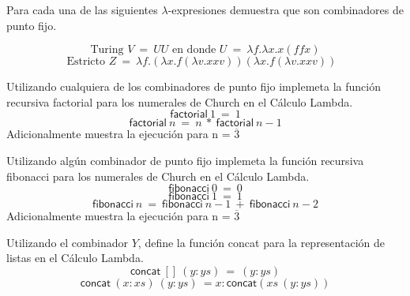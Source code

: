                 \begin{exercise}
                    Para cada una de las siguientes $\lambda$-expresiones demuestra que son combinadores de punto fijo.
                    

                        \[\text{Turing $V\ =\ UU$ en donde $U\ =\ \lambda f.\lambda x.x(ffx)$}\]
                        \[\text{Estricto $Z\ =\ \lambda f.(\lambda x.f(\lambda v.xxv))(\lambda x.f(\lambda v.xxv))$ }\]
            
                    
                \end{exercise}



                \begin{exercise}
                    Utilizando cualquiera de los combinadores de punto fijo implemeta la función recursiva \textsf{factorial} para los numerales de Church en el Cálculo Lambda.
                    \[ \textsf{factorial}\ 1\ =\ 1 \]
                    \[ \textsf{factorial}\ n\ =\ n\ *\ \textsf{factorial}\ n-1\]
                    Adicionalmente muestra la ejecución para n = $\overline{3}$
                \end{exercise}



                \begin{exercise}
                    Utilizando algún combinador de punto fijo implemeta la función recursiva \textsf{fibonacci} para los numerales de Church en el Cálculo Lambda.
                    \[ \textsf{fibonacci}\ 0\ =\ 0 \]
                    \[ \textsf{fibonacci}\ 1\ =\ 1 \]
                    \[ \textsf{fibonacci}\ n\ =\ \textsf{fibonacci}\ n-1\ +\ \textsf{fibonacci}\ n-2\]
                    Adicionalmente muestra la ejecución para n = $\overline{3}$
                \end{exercise}



                \begin{exercise}
                    Utilizando el combinador $Y$, define la función \textsf{concat} para la representación de listas en el Cálculo Lambda.
                    \[
                        \textsf{concat}\ []\ (y:ys)\ =\ (y:ys)
                    \]
                    \[
                        \textsf{concat}\ (x:xs)\ (y:ys)\ = x:\textsf{concat}(xs\ (y:ys))
                    \]
                \end{exercise}



